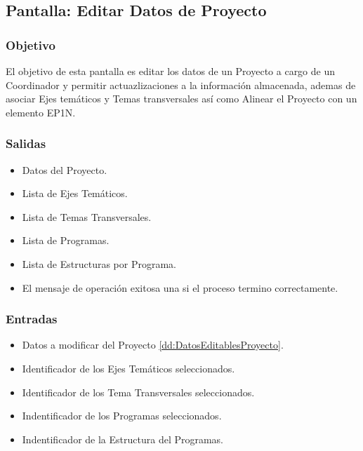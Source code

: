 \subsection{Pantalla: Editar Datos de Proyecto}

\subsubsection{Objetivo}
El objetivo de esta pantalla es editar los datos de un Proyecto a cargo de un Coordinador y permitir actuazlizaciones a la información almacenada, ademas de asociar Ejes temáticos y Temas transversales así como Alinear el Proyecto con un elemento EP1N.


\subsubsection{Salidas}
\begin{itemize}
 \item Datos del Proyecto.
 \item Lista de Ejes Temáticos.
 \item Lista de Temas Transversales.
 \item Lista de Programas.
 \item Lista de Estructuras por Programa.
 \item El mensaje de operación exitosa una si el proceso termino correctamente.
\end{itemize}

\subsubsection{Entradas}
\begin{itemize}
 \item Datos a modificar del Proyecto \ref{dd:DatosEditablesProyecto}.
 \item Identificador de los Ejes Temáticos seleccionados.
 \item Identificador de los Tema Transversales seleccionados.
 \item Indentificador de los Programas seleccionados.
 \item Indentificador de la Estructura del Programas.
\end{itemize}


